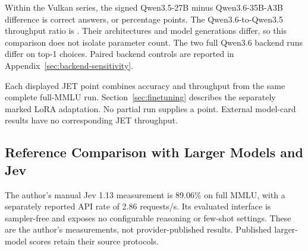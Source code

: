 Within the Vulkan series, the signed Qwen3.5-27B minus Qwen3.6-35B-A3B
difference is  correct answers,
or  percentage points.
The Qwen3.6-to-Qwen3.5 throughput ratio is
. Their architectures and model
generations differ, so this comparison does not isolate parameter count.
The two full Qwen3.6 backend runs differ on
 top-1 choices. Paired backend controls
are reported in Appendix~\ref{sec:backend-sensitivity}.



Each displayed JET point combines accuracy and throughput from the same
complete full-MMLU run. Section~\ref{sec:finetuning} describes the separately
marked LoRA adaptation. No partial run supplies a point. External model-card
results have no corresponding JET throughput.

\subsection{Reference Comparison with Larger Models and Jev}
The author's manual Jev 1.13 measurement is 89.06\% on full MMLU,
with a separately reported API rate of 2.86 requests/s. Its evaluated interface
is sampler-free and exposes no configurable reasoning or few-shot settings.
These are the author's measurements, not provider-published results.
Published larger-model scores retain their source protocols.

